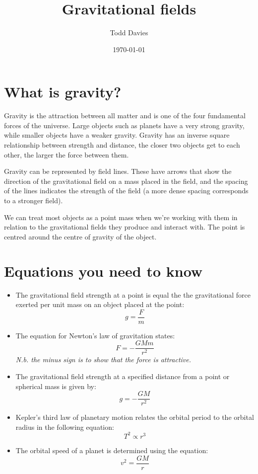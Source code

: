 \documentclass{article}
\title{Gravitational fields}
\author{Todd Davies}
\date{\today}
\begin{document}
\lhead{\today}
\setlength{\parindent}{0cm}

\maketitle

\section*{What is gravity?}
\thispagestyle{empty}
Gravity is the attraction between all matter and is one of the four fundamental
forces of the universe. Large objects such as planets have a very strong
gravity, while smaller objects have a weaker gravity. Gravity has an inverse
square relationship between strength and distance, the closer two objects get to
each other, the larger the force between them.

Gravity can be represented by field lines. These have arrows that show the
direction of the gravitational field on a mass placed in the field, and the
spacing of the lines indicates the strength of the field (a more dense spacing
corresponds to a stronger field).

We can treat most objects as a point mass when we're working with them in
relation to the gravitational fields they produce and interact with. The point
is centred around the centre of gravity of the object.


\section*{Equations you need to know}

\begin{itemize}
	\item The gravitational field strength at a point is equal the the
	gravitational force exerted per unit mass on an object placed at the point:
	\[
		g = \frac{F}{m}
	\]
	\item The equation for Newton's law of gravitation states:
	\[
		F = -\frac{GMm}{r^2}
	\]
	\textit{N.b. the minus sign is to show that the force is attractive.}
	\item The gravitational field strength at a specified distance from a point
	or spherical mass is given by:
	\[
		g = -\frac{GM}{r^2}
	\]
	\item Kepler's third law of planetary motion relates the orbital period to
	the orbital radius in the following equation:
	\[
		T^2 \propto r^3
	\]
	\item The orbital speed of a planet is determined using the equation:
	\[
		v^2 = \frac{GM}{r}
	\]
\end{itemize}
\end{document}
